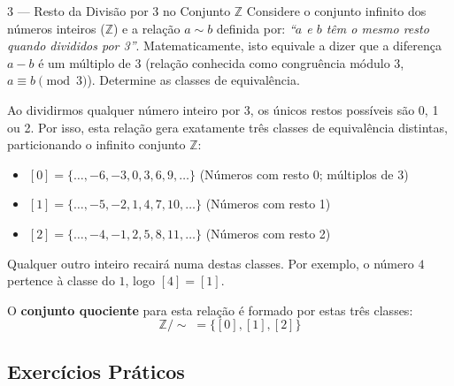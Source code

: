 \begin{exbox}{3 --- Resto da Divisão por 3 no Conjunto $\mathbb{Z}$}
  Considere o conjunto infinito dos números inteiros ($\mathbb{Z}$) e a relação $a \sim b$ definida por: \textit{``$a$ e $b$ têm o mesmo resto quando divididos por 3''}. Matematicamente, isto equivale a dizer que a diferença $a - b$ é um múltiplo de 3 (relação conhecida como congruência módulo 3, $a \equiv b \pmod{3}$). Determine as classes de equivalência.
\end{exbox}
\begin{solbox}
  Ao dividirmos qualquer número inteiro por 3, os únicos restos possíveis são 0, 1 ou 2. Por isso, esta relação gera exatamente três classes de equivalência distintas, particionando o infinito conjunto $\mathbb{Z}$:
  \begin{itemize}
      \item $[0] = \{\dots, -6, -3, 0, 3, 6, 9, \dots\}$ (Números com resto 0; múltiplos de 3)
      \item $[1] = \{\dots, -5, -2, 1, 4, 7, 10, \dots\}$ (Números com resto 1)
      \item $[2] = \{\dots, -4, -1, 2, 5, 8, 11, \dots\}$ (Números com resto 2)
  \end{itemize}
  Qualquer outro inteiro recairá numa destas classes. Por exemplo, o número $4$ pertence à classe do $1$, logo $[4] = [1]$. 
  
  O \textbf{conjunto quociente} para esta relação é formado por estas três classes:
  \[
      \mathbb{Z}/\sim \; = \{ [0], [1], [2] \}
  \]
\end{solbox}

\subsection{Exercícios Práticos}

